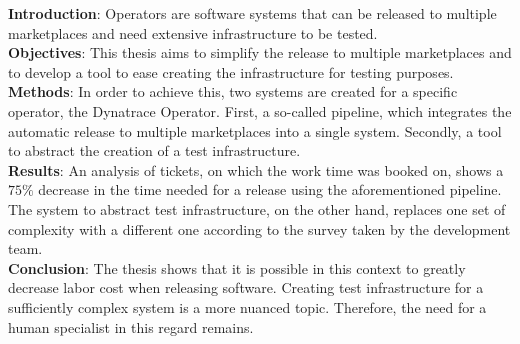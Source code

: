 \textbf{Introduction}:
Operators are software systems that can be released to multiple marketplaces and need extensive infrastructure to be tested. \\
\textbf{Objectives}:
This thesis aims to simplify the release to multiple marketplaces and to develop a tool to ease creating the infrastructure for testing purposes. \\
\textbf{Methods}:
In order to achieve this, two systems are created for a specific operator, the Dynatrace Operator.
First, a so-called pipeline, which integrates the automatic release to multiple marketplaces into a single system.
Secondly, a tool to abstract the creation of a test infrastructure. \\
\textbf{Results}:
An analysis of tickets, on which the work time was booked on, shows a $75 \%$ decrease in the time needed for a release using the aforementioned pipeline.
The system to abstract test infrastructure, on the other hand, replaces one set of complexity with a different one according to the survey taken by the development team. \\
\textbf{Conclusion}:
The thesis shows that it is possible in this context to greatly decrease labor cost when releasing software.
Creating test infrastructure for a sufficiently complex system is a more nuanced topic.
Therefore, the need for a human specialist in this regard remains.
